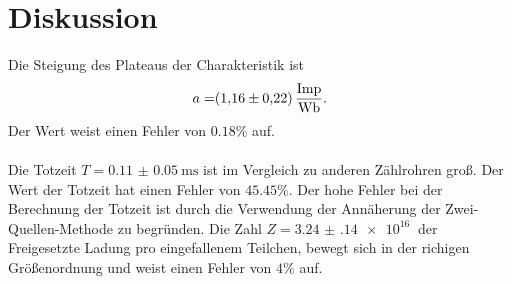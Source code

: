 \section{Diskussion}
\label{sec:Diskussion}

Die Steigung des Plateaus der Charakteristik ist 
\begin{align}
 a =& \SI{1.16(22)}{\frac{\text{Imp}}{\weber}}. \\
\end{align}
Der Wert weist einen Fehler von $0.18\%$ auf.
\\\\
Die Totzeit $T = \SI{0.11(5)}{\milli\second}$ ist im Vergleich zu anderen Zählrohren groß.
Der Wert der Totzeit hat einen Fehler von $45.45\%$.
Der hohe Fehler bei der Berechnung der Totzeit ist durch die Verwendung der Annäherung der Zwei-Quellen-Methode zu begründen.
Die Zahl $Z = \SI{3.24(14)e+16}{}$ der Freigesetzte Ladung pro eingefallenem Teilchen, bewegt sich in der richigen Größenordnung und weist einen Fehler von $4\%$ auf.
